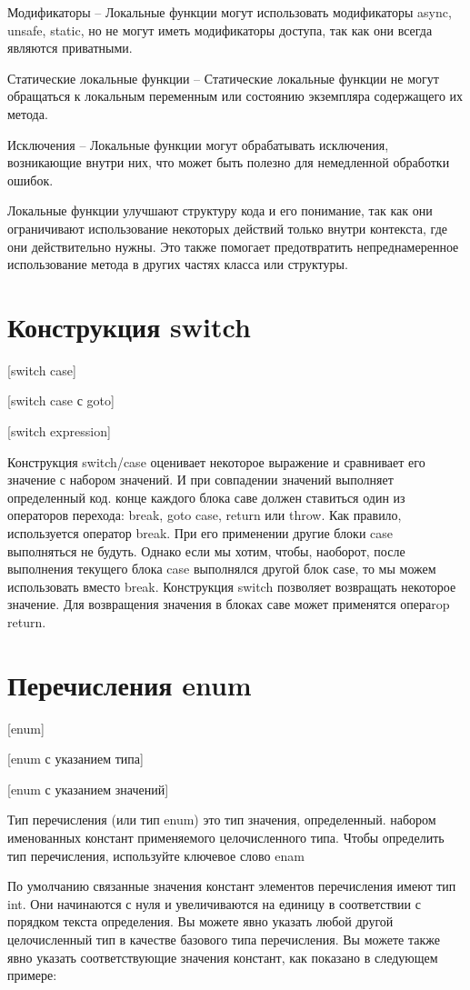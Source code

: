 \documentclass{bsuir}
\begin{document}
Модификаторы -- Локальные функции могут использовать модификаторы async, unsafe,
static, но не могут иметь модификаторы доступа, так как они всегда являются
приватными.
    
Статические локальные функции -- Статические локальные функции не могут
обращаться к локальным переменным или состоянию экземпляра содержащего их
метода.
    
Исключения -- Локальные функции могут обрабатывать исключения, возникающие
внутри них, что может быть полезно для немедленной обработки ошибок.

Локальные функции улучшают структуру кода и его понимание, так как они
ограничивают использование некоторых действий только внутри контекста, где они
действительно нужны. Это также помогает предотвратить непреднамеренное
использование метода в других частях класса или структуры.

\section{Конструкция switch}

[switch case]

[switch case с goto]

[switch expression]

Конструкция switch/case оценивает некоторое выражение и сравнивает его значение
с набором значений. И при совпадении значений выполняет определенный код. конце
каждого блока саве должен ставиться один из операторов перехода: break, goto
case, return или throw. Как правило, используется оператор break. При его
применении другие блоки case выполняться не будуть. Однако если мы хотим, чтобы,
наоборот, после выполнения текущего блока case выполнялся другой блок саѕе, то
мы можем использовать вместо break. Конструкция switch позволяет возвращать
некоторое значение. Для возвращения значения в блоках саве может применятся
операrop return.

\section{Перечисления enum}

[enum]

[enum с указанием типа]

[enum с указанием значений]

Тип перечисления (или тип enum) это тип значения, определенный. набором
именованных констант применяемого целочисленного типа. Чтобы определить тип
перечисления, используйте ключевое слово enam 

По умолчанию связанные значения констант элементов перечисления имеют тип int.
Они начинаются с нуля и увеличиваются на единицу в соответствии с порядком
текста определения. Вы можете явно указать любой другой целочисленный тип в
качестве базового типа перечисления. Вы можете также явно указать
соответствующие значения констант, как показано в следующем примере:
\end{document}
